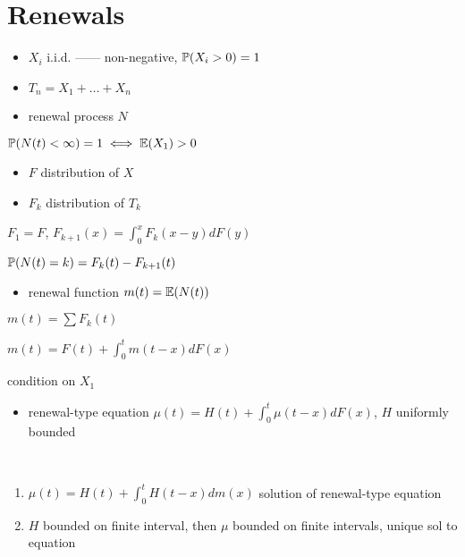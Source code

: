 \section{Renewals}\label{sec:renewals}

\begin{itemize}
    \item $X_i$ i.i.d. ------ non-negative, $\mathbb{P}(X_i > 0) = 1$
    \item $T_n = X_1 + \dots + X_n$
    \item renewal process $N$
\end{itemize}

\begin{thm}
    $\mathbb{P}(N(t) < \infty) = 1 \iff \mathbb{E}(X_1) > 0$
\end{thm}

\begin{itemize}
    \item $F$ distribution of $X$
    \item $F_k$ distribution of $T_k$
\end{itemize}

\begin{lemma}
    $F_1 = F$, $F_{k+1}(x) = \int_0^x F_k(x - y)dF(y)$
\end{lemma}

\begin{lemma}
    $\mathbb{P}(N(t) = k) = F_k(t) - F_{k+1}(t)$
\end{lemma}

\begin{itemize}
    \item renewal function $m(t) = \mathbb{E}(N(t))$
\end{itemize}

\begin{lemma}
    $m(t) = \sum F_k(t)$
\end{lemma}

\begin{lemma}
    $m(t) = F(t) + \int^t_0 m(t- x)dF(x)$
\end{lemma}
\begin{pf}
    condition on $X_1$
\end{pf}

\begin{itemize}
    \item renewal-type equation $\mu(t) = H(t) + \int^{t}_0 \mu(t-x)dF(x)$, $H$ uniformly bounded
\end{itemize}

\begin{thm}\,
    \begin{enumerate}
        \item $\mu(t) = H(t) + \int_0^t H(t - x)dm(x)$ solution of renewal-type equation
        \item $H$ bounded on finite interval, then $\mu$ bounded on finite intervals, unique sol to equation
    \end{enumerate}
\end{thm}

